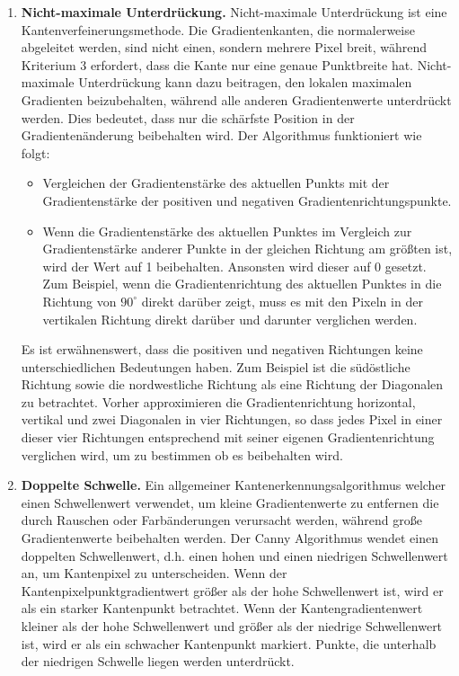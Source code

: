 \begin{enumerate}
	\item \textbf{Nicht-maximale Unterdrückung.} Nicht-maximale Unterdrückung ist eine Kantenverfeinerungsmethode. Die Gradientenkanten, die normalerweise abgeleitet werden, sind nicht einen, sondern mehrere Pixel breit, während Kriterium 3 erfordert, dass die Kante nur eine genaue Punktbreite hat. Nicht-maximale Unterdrückung kann dazu beitragen, den lokalen maximalen Gradienten beizubehalten, während alle anderen Gradientenwerte unterdrückt werden. Dies bedeutet, dass nur die schärfste Position in der Gradientenänderung beibehalten wird. Der Algorithmus funktioniert wie folgt:
	\begin{itemize}
	\item Vergleichen der Gradientenstärke des aktuellen Punkts mit der Gradientenstärke der positiven und negativen Gradientenrichtungspunkte.
	\item Wenn die Gradientenstärke des aktuellen Punktes im Vergleich zur Gradientenstärke anderer Punkte in der gleichen Richtung am größten ist, wird der Wert auf 1 beibehalten. Ansonsten wird dieser auf 0 gesetzt. Zum Beispiel, wenn die Gradientenrichtung des aktuellen Punktes in die Richtung von $90^{\circ}$ direkt darüber zeigt, muss es mit den Pixeln in der vertikalen Richtung direkt darüber und darunter verglichen werden.
	\end{itemize}
	
	Es ist erwähnenswert, dass die positiven und negativen Richtungen keine unterschiedlichen Bedeutungen haben. Zum Beispiel ist die südöstliche Richtung sowie die nordwestliche Richtung als eine Richtung der Diagonalen zu betrachtet. Vorher approximieren die Gradientenrichtung horizontal, vertikal und zwei Diagonalen in vier Richtungen, so dass jedes Pixel in einer dieser vier Richtungen entsprechend mit seiner eigenen Gradientenrichtung verglichen wird, um zu bestimmen ob es beibehalten wird. 
	
	
	\item \textbf{Doppelte Schwelle.} Ein allgemeiner Kantenerkennungsalgorithmus welcher einen Schwellenwert verwendet, um kleine Gradientenwerte zu entfernen die durch Rauschen oder Farbänderungen verursacht werden, während große Gradientenwerte beibehalten werden.
Der Canny Algorithmus wendet einen doppelten Schwellenwert, d.h. einen hohen und einen niedrigen Schwellenwert an, um Kantenpixel zu unterscheiden. Wenn der Kantenpixelpunktgradientwert größer als der hohe Schwellenwert ist, wird er als ein starker Kantenpunkt betrachtet. Wenn der Kantengradientenwert kleiner als der hohe Schwellenwert und größer als der niedrige Schwellenwert ist, wird er als ein schwacher Kantenpunkt markiert. Punkte, die unterhalb der niedrigen Schwelle liegen werden unterdrückt.


\end{enumerate}

